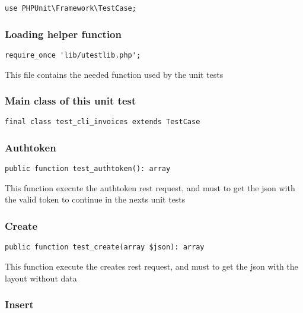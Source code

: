\documentclass[a4paper]{article}
\begin{document}
\begin{lstlisting}
use PHPUnit\Framework\TestCase;
\end{lstlisting}

\hypertarget{toc65}{}
\subsubsection{Loading helper function}

\begin{lstlisting}
require_once 'lib/utestlib.php';
\end{lstlisting}

This file contains the needed function used by the unit tests

\hypertarget{toc66}{}
\subsubsection{Main class of this unit test}

\begin{lstlisting}
final class test_cli_invoices extends TestCase
\end{lstlisting}

\hypertarget{toc67}{}
\subsubsection{Authtoken}

\begin{lstlisting}
public function test_authtoken(): array
\end{lstlisting}

This function execute the authtoken rest request, and must to get the
json with the valid token to continue in the nexts unit tests

\hypertarget{toc68}{}
\subsubsection{Create}

\begin{lstlisting}
public function test_create(array $json): array
\end{lstlisting}

This function execute the creates rest request, and must to get the
json with the layout without data

\hypertarget{toc69}{}
\subsubsection{Insert}
\end{document}
